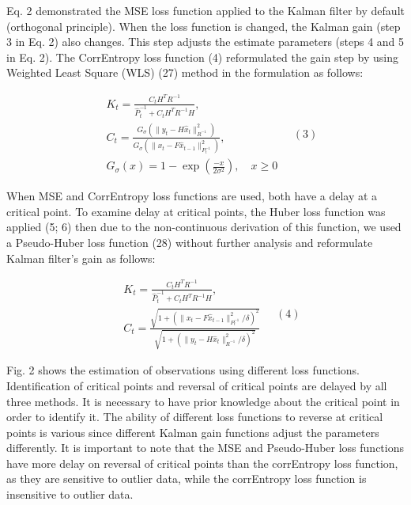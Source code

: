 \documentclass[12pt,a4paper]{article}
\begin{document}
	Eq. 2 demonstrated the MSE loss function applied to the Kalman filter by default (orthogonal principle). When the loss function is changed, the Kalman gain (step 3 in Eq. 2) also changes. This step adjusts the estimate parameters (steps 4 and 5 in Eq. 2). The CorrEntropy loss function (4) reformulated the gain step by using Weighted Least Square (WLS) (27) method in the formulation as follows:
	
	\begin{equation}
		\begin{array}{rl} 
			& K_t = \frac{C_tH^T R^{-1}}{\hat{P}_t^{-1} + C_tH^T R^{-1}H},\\
			& C_t = \frac{G_\sigma(\|y_t - H\hat{x}_t\|_{R^{-1}}^2)}{G_\sigma(\|x_t - F\hat{x}_{t - 1}\|_{P_t^{-1}}^2)},\\
			& G_\sigma (x) = 1 - \exp (\frac{-x}{2\sigma^2}),\quad x\geq 0 
		\end{array} \quad (3)
	\end{equation}
	
	When MSE and CorrEntropy loss functions are used, both have a delay at a critical point. To examine delay at critical points, the Huber loss function was applied (5; 6) then due to the non-continuous derivation of this function, we used a Pseudo-Huber loss function (28) without further analysis and reformulate Kalman filter's gain as follows:
	
	\begin{equation}
		\begin{array}{rl} 
			& K_t = \frac{C_tH^T R^{-1}}{\hat{P}_t^{-1} + C_tH^T R^{-1}H},\\
			& C_t = \frac{\sqrt{1 + (\|x_t - F\hat{x}_{t - 1}\|_{P_t^{-1}}^2 / \delta)^2}}{\sqrt{1 + (\|y_t - H\hat{x}_t\|_{R^{-1}}^2 / \delta)^2}} 
		\end{array} \quad (4)
	\end{equation}
	
	Fig. 2 shows the estimation of observations using different loss functions. Identification of critical points and reversal of critical points are delayed by all three methods. It is necessary to have prior knowledge about the critical point in order to identify it. The ability of different loss functions to reverse at critical points is various since different Kalman gain functions adjust the parameters differently. It is important to note that the MSE and Pseudo-Huber loss functions have more delay on reversal of critical points than the corrEntropy loss function, as they are sensitive to outlier data, while the corrEntropy loss function is insensitive to outlier data.
	
\end{document}
